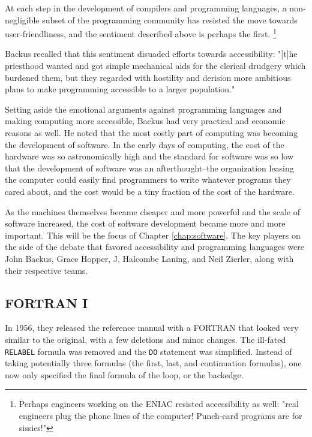 At each step in the development of compilers and programming languages,
a non-negligible subset of the programming community has resisted the move
towards user-friendliness, and the sentiment \citeauthor{brown_carr_automatic_onr_symposium_1954}
described above is perhaps the first.
\footnote{
	Perhaps engineers working on the ENIAC resisted accessibility as well:
	"real engineers plug the phone lines of the computer! Punch-card programs are for sissies!"
}

Backus recalled that this sentiment disuaded efforts towards accessibility:
"[t]he priesthood wanted and got simple mechanical aids for the clerical
drudgery which burdened them, but they regarded with hostility and derision
more ambitious plans to make programming accessible to a larger population."

Setting aside the emotional arguments against programming languages and making
computing more accessible, Backus had very practical and economic reasons as well.
He noted that the most costly part of computing was becoming the development of
software. In the early days of computing, the cost of the hardware was so
astronomically high and the standard for software was so low that the development of software
was an afterthought--the organization leasing the computer could easily find
programmers to write whatever programs they cared about, and the cost would be
a tiny fraction of the cost of the hardware.

As the machines themselves became cheaper and more powerful and the scale of software
increased, the cost of software development became more and more important.
This will be the focus of Chapter \ref{chap:software}.
The key players on the side of the debate that favored accessibility and
programming languages were John Backus, Grace Hopper, J. Halcombe Laning,
and Neil Zierler, along with their respective teams.

\subsection{FORTRAN I}

In 1956, they released the reference manual  with a FORTRAN
that looked very similar to the original, with a few deletions and minor changes.
The ill-fated \texttt{RELABEL} formula was removed and the \texttt{DO} statement was simplified.
Instead of taking potentially three formulas (the first, last, and continuation formulas),
one now only specified the final formula of the loop, or the \gls{backedge}.

